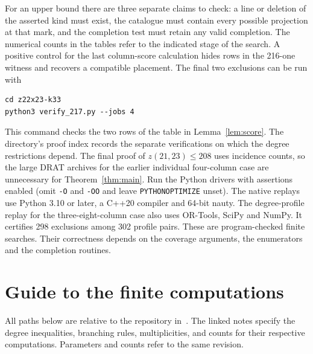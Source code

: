 \documentclass[11pt]{article}
\newcommand{\code}[1]{\nolinkurl{#1}}
\begin{document}
For an upper bound there are three separate claims to check: a line or
deletion of the asserted kind must exist, the catalogue must contain
every possible projection at that mark, and the completion test must
retain any valid completion. The numerical counts in the tables refer
to the indicated stage of the search. A positive control for the last
column-score calculation hides rows in the 216-one witness and recovers
a compatible placement. The final two exclusions can be run with
\begin{verbatim}
cd z22x23-k33
python3 verify_217.py --jobs 4
\end{verbatim}
This command checks the two rows of the table in Lemma~\ref{lem:score}.
The directory's proof index records the separate verifications on
which the degree restrictions depend. The final proof of
$z(21,23)\le208$ uses incidence counts, so the large DRAT archives for
the earlier individual four-column case are unnecessary for
Theorem~\ref{thm:main}. Run the Python drivers with assertions enabled
(omit \code{-O} and \code{-OO} and leave \code{PYTHONOPTIMIZE} unset).
The native replays use Python 3.10 or later, a C++20 compiler and 64-bit
nauty. The degree-profile replay for the three-eight-column case also uses
OR-Tools, SciPy and NumPy. It certifies 298 exclusions among 302 profile
pairs. These are program-checked finite searches. Their
correctness depends on the coverage arguments, the enumerators and the
completion routines.

\appendix
\section{Guide to the finite computations}\label{app:files}
All paths below are relative to the repository in~\cite{code}. The
linked notes specify the degree inequalities, branching rules,
multiplicities, and counts for their respective computations. Parameters
and counts refer to the same revision.
\end{document}
